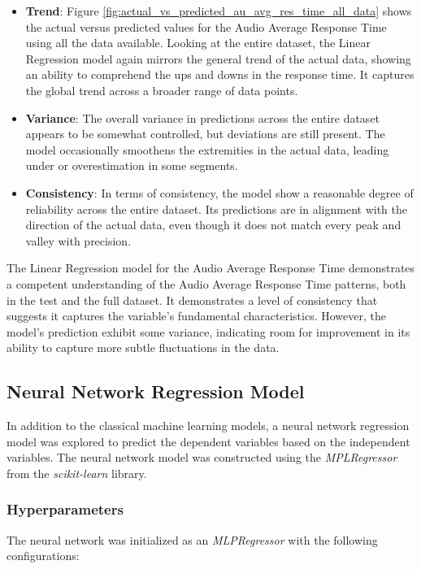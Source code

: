 \begin{itemize}
    \item \textbf{Trend}: Figure \ref{fig:actual_vs_predicted_au_avg_res_time_all_data} shows the actual versus predicted values for the Audio Average Response Time using all the data available. Looking
          at the entire dataset, the Linear Regression model again mirrors the general trend of the actual data, showing an ability to comprehend the ups and downs in the response time. It captures the global trend across a
          broader range of data points.

    \item \textbf{Variance}: The overall variance in predictions across the entire dataset appears to be somewhat controlled, but deviations are still present. The model occasionally smoothens the extremities
          in the actual data, leading under or overestimation in some segments.

    \item \textbf{Consistency}: In terms of consistency, the model show a reasonable degree of reliability across the entire dataset. Its predictions are in alignment with the direction of the actual data,
          even though it does not match every peak and valley with precision.

\end{itemize}


The Linear Regression model for the Audio Average Response Time demonstrates a competent understanding of the Audio Average Response Time patterns, both in the test and the full dataset. It demonstrates
a level of consistency that suggests it captures the variable's fundamental characteristics. However, the model's prediction exhibit some variance, indicating room for improvement in its ability to capture more
subtle fluctuations in the data.


\subsection{Neural Network Regression Model}

In addition to the classical machine learning models, a neural network regression model was explored to predict the dependent variables based on the independent variables. The neural network model was
constructed using the \textit{MPLRegressor} from the \textit{scikit-learn} library.

\subsubsection*{Hyperparameters} The neural network was initialized as an \textit{MLPRegressor} with the following configurations:

